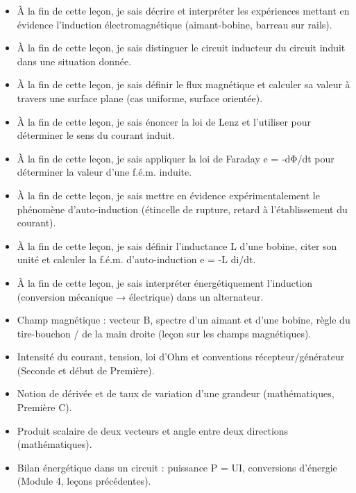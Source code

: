 \documentclass[11pt]{article}
\begin{document}
\begin{objectifs}
\begin{itemize}
\item À la fin de cette leçon, je sais décrire et interpréter les expériences mettant en évidence l'induction électromagnétique (aimant-bobine, barreau sur rails).
\item À la fin de cette leçon, je sais distinguer le circuit inducteur du circuit induit dans une situation donnée.
\item À la fin de cette leçon, je sais définir le flux magnétique et calculer sa valeur à travers une surface plane (cas uniforme, surface orientée).
\item À la fin de cette leçon, je sais énoncer la loi de Lenz et l'utiliser pour déterminer le sens du courant induit.
\item À la fin de cette leçon, je sais appliquer la loi de Faraday e = -dΦ/dt pour déterminer la valeur d'une f.é.m. induite.
\item À la fin de cette leçon, je sais mettre en évidence expérimentalement le phénomène d'auto-induction (étincelle de rupture, retard à l'établissement du courant).
\item À la fin de cette leçon, je sais définir l'inductance L d'une bobine, citer son unité et calculer la f.é.m. d'auto-induction e = -L di/dt.
\item À la fin de cette leçon, je sais interpréter énergétiquement l'induction (conversion mécanique → électrique) dans un alternateur.
\end{itemize}
\end{objectifs}

\begin{prerequis}
\begin{itemize}
\item Champ magnétique : vecteur B, spectre d'un aimant et d'une bobine, règle du tire-bouchon / de la main droite (leçon sur les champs magnétiques).
\item Intensité du courant, tension, loi d'Ohm et conventions récepteur/générateur (Seconde et début de Première).
\item Notion de dérivée et de taux de variation d'une grandeur (mathématiques, Première C).
\item Produit scalaire de deux vecteurs et angle entre deux directions (mathématiques).
\item Bilan énergétique dans un circuit : puissance P = UI, conversions d'énergie (Module 4, leçons précédentes).
\end{itemize}
\end{prerequis}
\end{document}
